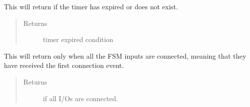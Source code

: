 \documentclass[letterpaper,10pt,english]{sphinxmanual}
\begin{document}

\begin{fulllineitems}
\label{\detokenize{fsm:tmrExpired}}
This will return  if the timer has expired or does not exist.
\begin{quote}\begin{description}
\item[{Returns}] \leavevmode
timer expired condition

\end{description}\end{quote}

\end{fulllineitems}


\begin{fulllineitems}
\label{\detokenize{fsm:isIoConnected}}
This will return  only when all the FSM inputs are connected,
meaning that they have received the first connection event.
\begin{quote}\begin{description}
\item[{Returns}] \leavevmode
{} if all I/Os are connected.

\end{description}\end{quote}

\end{fulllineitems}

\end{document}
